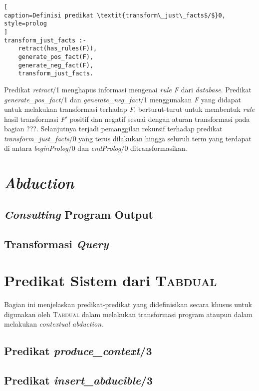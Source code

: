 \begin{lstlisting}[
caption=Definisi predikat \textit{transform\_just\_facts$/$}0,
style=prolog
]
transform_just_facts :-
	retract(has_rules(F)),
	generate_pos_fact(F),
	generate_neg_fact(F),
	transform_just_facts.
\end{lstlisting}

Predikat \textit{retract$/$}1 menghapus informasi mengenai \textit{rule F} dari \textit{database}. Predikat \textit{generate\_pos\_fact$/$}1 dan \textit{generate\_neg\_fact$/$}1 menggunakan \textit{F} yang didapat untuk melakukan transformasi terhadap \textit{F}, berturut-turut untuk membentuk \textit{rule} hasil transformasi \textit{F$'$} positif dan negatif sesuai dengan aturan transformasi pada bagian ???. Selanjutnya terjadi pemanggilan rekursif terhadap predikat \textit{transform\_just\_facts$/$}0 yang terus dilakukan hingga seluruh term yang terdapat di antara \textit{beginProlog$/$}0 dan \textit{endProlog$/$}0 ditransformasikan.

\section{\textit{Abduction}}

\subsection{\textit{Consulting} Program Output}

\subsection{Transformasi \textit{Query}}

\section{Predikat Sistem dari \textsc{Tabdual}}

Bagian ini menjelaskan predikat-predikat yang didefinisikan secara khusus untuk digunakan oleh \textsc{Tabdual} dalam melakukan transformasi program ataupun dalam melakukan \textit{contextual abduction}.

\subsection{Predikat \textit{produce\_context}/3}

\subsection{Predikat \textit{insert\_abducible}/3}

